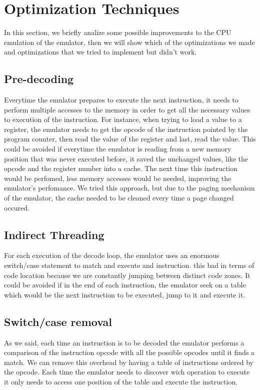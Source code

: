 \section{Optimization Techniques}
In this section, we briefly analize some possible improvements to the CPU emulation of the emulator, then we will show which of the optimizations we made and optimizations that we tried to implement but didn't work.

\subsection{Pre-decoding}
Everytime the emulator prepares to execute the next instruction, it needs to perform multiple accesses to the memory in order to get all the necessary values to execution of the instruction. For instance, when trying to load a value to a register, the emulator needs to get the opcode of the instruction pointed by the program counter, then read the value of the register and last, read the value. This could be avoided if everytime the emulator is reading from a new memory position that was never executed before, it saved the unchanged values, like the opcode and the register number into a cache. The next time this instruction would be perfomed, less memory accesses would be needed, improving the emulator’s perfomance.
We tried this approach, but due to the paging mechanism of the emulator, the cache needed to be cleaned every time a page changed occured.

\subsection{Indirect Threading}
For each execution of the decode loop, the emulator uses an enormous switch/case statement to match and execute and instruction. this bad in terms of code location because we are constantly jumping between distinct code zones. It could be avoided if in the end of each instruction, the emulator seek on a table which would be the next instruction to be executed, jump to it and execute it.

\subsection{Switch/case removal}
As we said, each time an instruction is to be decoded the emulator performs a comparison of the instruction opcode with all the possible opcodes until it finds a match. We can remove this overhead by having a table of instructions ordered by the opcode. Each time the emulator needs to discover wich operation to execute it only needs to access one position of the table and execute the instruction.

